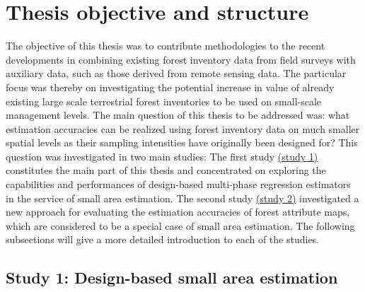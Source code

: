 
\newpage
\section{Thesis objective and structure}
\label{sec:intro:obj_and_struct}

The objective of this thesis was to contribute methodologies to the recent developments in combining existing forest inventory data from field surveys with auxiliary data, such as those derived from remote sensing data. The particular focus was thereby on investigating the potential increase in value of already existing large scale terrestrial forest inventories to be used on small-scale management levels. The main question of this thesis to be addressed was: what estimation accuracies can be realized using forest inventory data on much smaller spatial levels as their sampling intensities have originally been designed for? This question was investigated in two main studies: The first study \hyperref[sec:study1]{(study 1)} constitutes the main part of this thesis and concentrated on exploring the capabilities and performances of design-based multi-phase regression estimators in the service of small area estimation. The second study \hyperref[sec:study2]{(study 2)} investigated a new approach for evaluating the estimation accuracies of forest attribute maps, which are considered to be a special case of small area estimation. The following subsections will give a more detailed introduction to each of the studies.


\subsection{Study 1: Design-based small area estimation}
\label{sec:study1}


